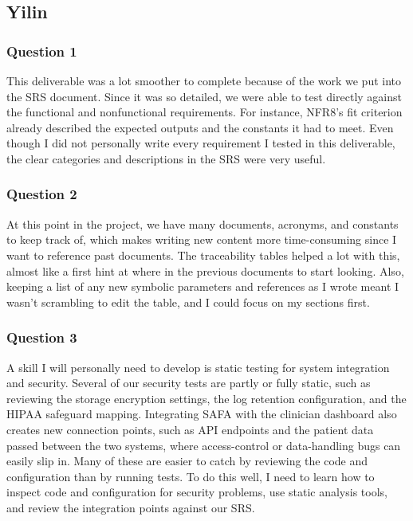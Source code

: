 \documentclass[12pt, titlepage]{article}
\renewcommand{\_}{\oldunderscore\allowbreak}
\begin{document}
\subsection*{Yilin}
\subsubsection*{Question 1}
This deliverable was a lot smoother to complete because of the work we put into the SRS document. Since it was so detailed, we were able to test directly against the functional and nonfunctional requirements. For instance, NFR8’s fit criterion already described the expected outputs and the constants it had to meet. Even though I did not personally write every requirement I tested in this deliverable, the clear categories and descriptions in the SRS were very useful.
\subsubsection*{Question 2}
At this point in the project, we have many documents, acronyms, and constants to keep track of, which makes writing new content more time-consuming since I want to reference past documents. The traceability tables helped a lot with this, almost like a first hint at where in the previous documents to start looking. Also, keeping a list of any new symbolic parameters and references as I wrote meant I wasn’t scrambling to edit the table, and I could focus on my sections first.
\subsubsection*{Question 3}
A skill I will personally need to develop is static testing for system integration and security. Several of our security tests are partly or fully static, such as reviewing the storage encryption settings, the log retention configuration, and the HIPAA safeguard mapping. Integrating SAFA with the clinician dashboard also creates new connection points, such as API endpoints and the patient data passed between the two systems, where access-control or data-handling bugs can easily slip in. Many of these are easier to catch by reviewing the code and configuration than by running tests. To do this well, I need to learn how to inspect code and configuration for security problems, use static analysis tools, and review the integration points against our SRS.
\end{document}
